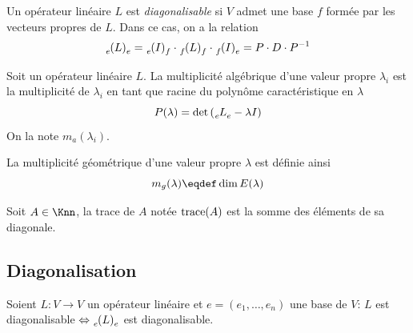 \begin{mydef}
	Un opérateur linéaire $L$ est \emph{diagonalisable} si $V$ admet une base $f$ formée par les vecteurs propres de $L$. Dans ce cas, on a la relation
	\[ \tensor*[_e]{(L)}{_e}
	= \tensor*[_e]{(I)}{_f} \cdot \tensor*[_f]{(L)}{_f} \cdot \tensor*[_f]{(I)}{_e}
	= P \cdot D \cdot P^{-1} \]
\end{mydef}

\begin{mydef}
	Soit un opérateur linéaire $L$.
	La multiplicité algébrique d'une valeur propre $\lambda_i$ est la multiplicité de $\lambda_i$ en tant que racine du polynôme caractéristique en $\lambda$
	\[ P(\lambda) = \det \left( \tensor*[_e]{L}{_e} - \lambda I \right) \]
	On la note $m_a(\lambda_i)$.
\end{mydef}

\begin{mydef}
	La multiplicité géométrique d'une valeur propre $\lambda$ est définie ainsi
	\[ m_g(\lambda) \eqdef \newdim E(\lambda) \]
\end{mydef}

\begin{mydef}
	Soit $A \in \Knn$,
	la trace de $A$ notée $\operatorname{trace}(A)$ est la somme des éléments de sa diagonale.
\end{mydef}

\subsection{Diagonalisation}

\begin{myprop}
	Soient $L : V \to V$ un opérateur linéaire et $e = (e_1, \dots, e_n)$ une base de $V$:
	$L$ est diagonalisable $\Leftrightarrow \tensor[_e]{(L)}{_e}$ est diagonalisable.
\end{myprop}

